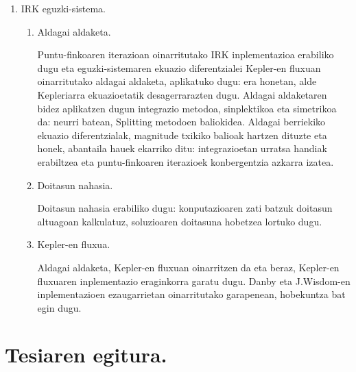 \begin{enumerate}
\item IRK eguzki-sistema.

\begin{enumerate}
\item Aldagai aldaketa.

Puntu-finkoaren iterazioan oinarritutako IRK inplementazioa erabiliko dugu eta eguzki-sistemaren ekuazio diferentzialei Kepler-en fluxuan oinarritutako aldagai aldaketa, aplikatuko dugu: era honetan, alde Kepleriarra ekuazioetatik desagerrarazten dugu.
Aldagai aldaketaren bidez aplikatzen dugun integrazio metodoa, sinplektikoa eta simetrikoa da: neurri batean, Splitting metodoen baliokidea. Aldagai berriekiko ekuazio diferentzialak, magnitude txikiko balioak hartzen dituzte eta honek, abantaila hauek ekarriko ditu: integrazioetan urratsa handiak erabiltzea eta puntu-finkoaren iterazioek konbergentzia azkarra izatea.

\item Doitasun nahasia.

Doitasun nahasia erabiliko dugu: konputazioaren zati batzuk doitasun altuagoan kalkulatuz, soluzioaren doitasuna hobetzea lortuko dugu.    

\item Kepler-en fluxua.

Aldagai aldaketa, Kepler-en fluxuan oinarritzen da eta beraz, Kepler-en fluxuaren inplementazio eraginkorra garatu dugu. Danby \cite{Danby1992} eta J.Wisdom-en \cite{Wisdom2015} inplementazioen ezaugarrietan oinarritutako garapenean, hobekuntza bat egin dugu.  
\end{enumerate}







\end{enumerate}        


\section{Tesiaren egitura.}

